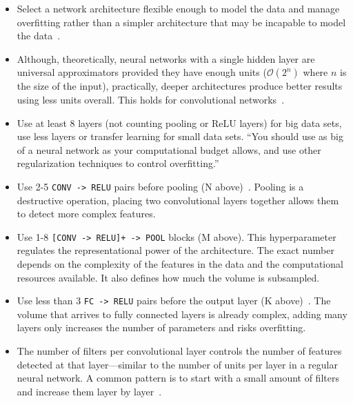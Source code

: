 \begin{itemize}
	\item Select a network architecture flexible enough to model the data and manage overfitting rather than a simpler architecture that may be incapable to model the data~\cite{Ng2014, Krizhevsky2012}. 

	\item Although, theoretically, neural networks with a single hidden layer are universal approximators provided they have enough units ($\mathcal{O}(2^n)$ where $n$ is the size of the input), practically, deeper architectures produce better results using less units overall. This holds for convolutional networks~\cite{Bengio2014}.

	\item Use at least 8 layers (not counting pooling or ReLU layers) for big data sets, use less layers or transfer learning for small data sets. ``You should use as big of a neural network as your computational budget allows, and use other regularization techniques to control overfitting.''~\cite{Karpathy2016}

	\item Use 2-5 \texttt{CONV -> RELU} pairs before pooling (N above)~\cite{Karpathy2016}. Pooling is a destructive operation, placing two convolutional layers together allows them to detect more complex features.

	\item Use 1-8 \texttt{[CONV -> RELU]+ -> POOL} blocks (M above). This hyperparameter regulates the representational power of the architecture. The exact number depends on the complexity of the features in the data and the computational resources available. It also defines how much the volume is subsampled.

	\item Use less than 3 \texttt{FC -> RELU} pairs before the output layer (K above)~\cite{Karpathy2016}. The volume that arrives to fully connected layers is already complex, adding many layers only increases the number of parameters and risks overfitting.

	\item The number of filters per convolutional layer controls the number of features detected at that layer---similar to the number of units per layer in a regular neural network. A common pattern is to start with a small amount of filters and increase them layer by layer~\cite{Simonyan2014}. %


\end{itemize}
